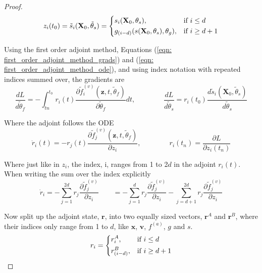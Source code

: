 \documentclass{article}
\theoremstyle{remark}
\theoremstyle{definition}
\begin{document}
\begin{proof}
\begin{equation}
\label{eqn: z0_as_s_g}
    z_{i}(t_{0})= \tilde{s}_{i}(\mathbf{X}_{0}, \tilde{\theta}_{s})=
\begin{dcases}
    s_{i}(\mathbf{X}_{0}, \theta_{s}),& \text{if } i\leq d\\
    g_{(i-d)}(s(\mathbf{X}_{0}, \theta_{s}),\theta_{g}),              & \text{if } i\geq d+1 \\
\end{dcases}
\end{equation}

Using the first order adjoint method, Equations (\ref{eqn: first_order_adjoint_method_grads}) and (\ref{eqn: first_order_adjoint_method_ode}), and using index notation with repeated indices summed over, the gradients are
\begin{equation}
    \frac{dL}{d\tilde{\theta}_{f}} = -\int_{t{n}}^{t_{0}}r_{i}(t)\frac{\partial \tilde{f}^{(v)}_{i}(\mathbf{z}, t, \tilde{\theta}_{f})}{\partial \tilde{\theta}_{f}}dt,
    \qquad\qquad
    \frac{dL}{d\tilde{\theta}_{s}} = r_{i}(t_{0})
    \frac{d\tilde{s}_{i}(\mathbf{X}_{0}, \tilde{\theta}_{s})}{d\tilde{\theta}_{s}}
\end{equation}

Where the adjoint follows the ODE
\begin{equation}
    \dot{r}_{i}(t) = -r_{j}(t)\frac{\partial \tilde{f}^{(v)}_{j}(\mathbf{z}, t, \tilde{\theta}_{f})}{\partial z_{i}},
    \qquad\qquad
    r_{i}(t_{n}) = \frac{\partial L}{\partial z_{i}(t_{n})}
\end{equation}


Where just like in $z_{i}$, the index, i, ranges from 1 to 2$d$ in the adjoint $r_{i}(t)$. When writing the sum over the index explicitly
\begin{equation}
\label{eqn: explicit_sum_for_a_gradient}
\dot{r}_{i} = -\sum_{j = 1}^{2d}r_{j}\frac{\partial \tilde{f}^{(v)}_{j}}{\partial z_{i}}
\qquad
= -\sum_{j = 1}^{d}r_{j}\frac{\partial \tilde{f}^{(v)}_{j}}{\partial z_{i}}
-\sum_{j = d+1}^{2d}r_{j}\frac{\partial \tilde{f}^{(v)}_{j}}{\partial z_{i}}
\end{equation}

Now split up the adjoint state, $\mathbf{r}$, into two equally sized vectors, $\mathbf{r}^{A}$ and $\mathbf{r}^{B}$, where their indices only range from 1 to $d$, like $\mathbf{x}$, $\mathbf{v}$, $f^{(a)}$, $g$ and $s$.
\begin{equation}
\label{eqn: a_as_aa_ab}
    r_{i}= 
\begin{dcases}
    r^{A}_{i},         & \text{if } i\leq d\\
    r^{B}_{(i-d)},     & \text{if } i\geq d+1 \\
\end{dcases}
\end{equation}


\end{proof}
\end{document}
